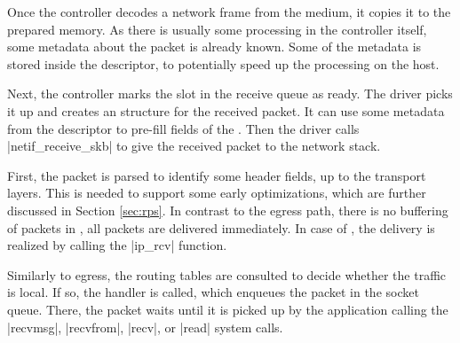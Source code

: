Once the controller decodes a network frame from the medium, it copies it to
the prepared memory. As there is usually some processing in the controller
itself, some metadata about the packet is already known. Some of the metadata
is stored inside the descriptor, to potentially speed up the processing on the
host.

Next, the controller marks the slot in the receive queue as ready. The driver
picks it up and creates an \skb{} structure for the received packet. It can use
some metadata from the descriptor to pre-fill fields of the \skb{}. Then the
driver calls \fnc|netif_receive_skb| to give the received packet to the network
stack.

First, the packet is parsed to identify some header fields, up to the
transport layers. This is needed to support some early optimizations, which are
further discussed in Section \ref{sec:rps}. In contrast to the egress path, there
is no buffering of packets in , all packets are delivered
immediately. In case of , the delivery is realized by calling the
\fnc|ip_rcv| function.

Similarly to egress, the routing tables are consulted to decide whether the
traffic is local. If so, the  handler is called, which enqueues the
packet in the socket queue. There, the packet waits until it is picked up by the
application calling the \fnc|recvmsg|, \fnc|recvfrom|, \fnc|recv|,
or \fnc|read| system calls.
